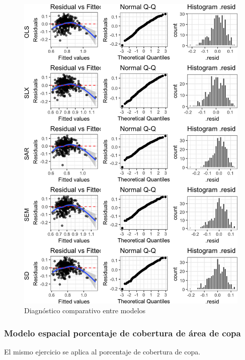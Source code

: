 \documentclass[12pt,]{book}
\newenvironment{Shaded}{\begin{snugshade}}{\end{snugshade}}
\newcommand{\KeywordTok}[1]{\textcolor[rgb]{0.13,0.29,0.53}{\textbf{#1}}}
\newcommand{\DataTypeTok}[1]{\textcolor[rgb]{0.13,0.29,0.53}{#1}}
\newcommand{\FloatTok}[1]{\textcolor[rgb]{0.00,0.00,0.81}{#1}}
\newcommand{\CommentTok}[1]{\textcolor[rgb]{0.56,0.35,0.01}{\textit{#1}}}
\newcommand{\OperatorTok}[1]{\textcolor[rgb]{0.81,0.36,0.00}{\textbf{#1}}}
\newcommand{\NormalTok}[1]{#1}
\begin{document}
\begin{figure}
\includegraphics[width=1\linewidth]{tesis-unigis_files/figure-latex/diag-model-espaciales-1} \caption{Diagnóstico comparativo entre modelos}\label{fig:diag-model-espaciales}
\end{figure}

\subsubsection{Modelo espacial porcentaje de cobertura de área de
copa}\label{modelo-espacial-porcentaje-de-cobertura-de-area-de-copa}

El mismo ejercicio se aplica al porcentaje de cobertura de copa.

\begin{Shaded}
\end{Shaded}
\end{document}
